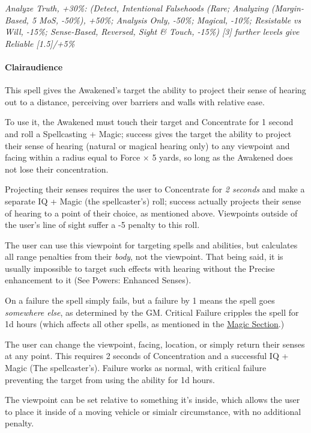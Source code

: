 \begin{multicols*}{3}
	\textcolor{OliveGreen}{\textit{Analyze Truth, +30\%: (Detect, Intentional Falsehoods (Rare; Analyzing (Margin-Based, 5 MoS, -50\%), +50\%; Analysis Only, -50\%; Magical, -10\%; Resistable vs Will, -15\%; Sense-Based, Reversed, Sight \& Touch, -15\%) [3] further levels give Reliable [1.5]/+5\%}}
	
	\paragraph{Clairaudience}
		
	This spell gives the Awakened's target the ability to project their sense of hearing out to a distance, perceiving over barriers and walls with relative ease.
	
	To use it, the Awakened must touch their target and Concentrate for 1 second and roll a Spellcasting + Magic; success gives the target the ability to project their sense of hearing (natural or magical hearing only) to any viewpoint and facing within a radius equal to Force $\times$ 5 yards, so long as the Awakened does not lose their concentration. 
	
	Projecting their senses requires the user to Concentrate for \textit{2 seconds} and make a separate IQ + Magic (the spellcaster's) roll; success actually projects their sense of hearing to a point of their choice, as mentioned above. Viewpoints outside of the user's line of sight suffer a -5 penalty to this roll.
	
	The user can use this viewpoint for targeting spells and abilities, but calculates all range penalties from their \textit{body}, not the viewpoint. That being said, it is usually impossible to target such effects with hearing without the Precise enhancement to it (See Powers: Enhanced Senses).
	
	On a failure the spell simply fails, but a failure by 1 means the spell goes \textit{somewhere else}, as determined by the GM. Critical Failure cripples the spell for 1d hours (which affects all other spells, as mentioned in the \hyperref[magic]{Magic Section}.)
	
	The user can change the viewpoint, facing, location, or simply return their senses at any point. This requires 2 seconds of Concentration and a successful IQ + Magic (The spellcaster's). Failure works as normal, with critical failure preventing the target from using the ability for 1d hours.
	
	The viewpoint can be set relative to something it's inside, which allows the user to place it inside of a moving vehicle or simialr circumstance, with no additional penalty.
	

\end{multicols*}
